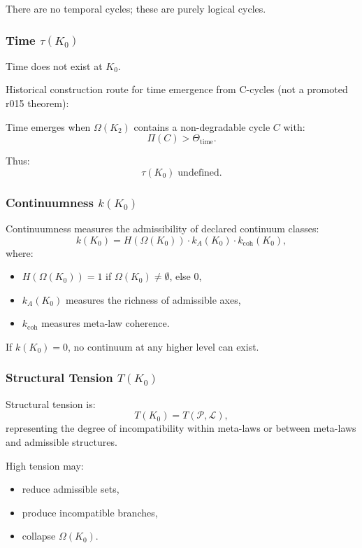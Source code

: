 There are no temporal cycles; these are purely logical cycles.

\subsubsection{Time \texorpdfstring{$\tau(K_0)$}{\tau(K_0)}}

Time does not exist at $K_0$.

Historical construction route for time emergence from C-cycles (not a promoted r015 theorem):

Time emerges when $\Omega(K_2)$ contains a non-degradable cycle
$C$ with:
\[
\Pi(C) > \Theta_{\mathrm{time}}.
\]

Thus:
\[
\tau(K_0) \;\text{undefined}.
\]

\subsubsection{Continuumness \texorpdfstring{$k(K_0)$}{k(K_0)}}

Continuumness measures the admissibility of declared continuum classes:
\[
k(K_0) =
H(\Omega(K_0)) \cdot
k_A(K_0) \cdot
k_{\mathrm{coh}}(K_0),
\]
where:
\begin{itemize}
    \item $H(\Omega(K_0)) = 1$ if $\Omega(K_0)\neq\emptyset$, else $0$,
    \item $k_A(K_0)$ measures the richness of admissible axes,
    \item $k_{\mathrm{coh}}$ measures meta-law coherence.
\end{itemize}

If $k(K_0)=0$, no continuum at any higher level can exist.

\subsubsection{Structural Tension \texorpdfstring{$T(K_0)$}{T(K_0)}}

Structural tension is:
\[
T(K_0) = T(\mathcal{P}, \mathcal{L}),
\]
representing the degree of incompatibility within meta-laws or between
meta-laws and admissible structures.

High tension may:
\begin{itemize}
    \item reduce admissible sets,
    \item produce incompatible branches,
    \item collapse $\Omega(K_0)$.
\end{itemize}

